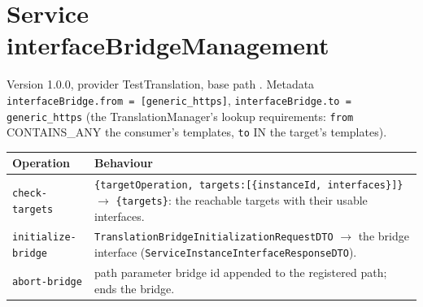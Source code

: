 \documentclass[a4paper]{arrowhead}
\begin{document}
\ArrowheadSetup
\section{Service interfaceBridgeManagement}
Version 1.0.0, provider TestTranslation, base path . Metadata \texttt{interfaceBridge.from = [generic\_https]}, \texttt{interfaceBridge.to = generic\_https} (the TranslationManager's lookup requirements: \texttt{from} CONTAINS\_ANY the consumer's templates, \texttt{to} IN the target's templates).
\begin{longtable}{p{}p{}}\toprule
Operation & Behaviour\\\midrule\endhead
\texttt{check-targets} & \texttt{\{targetOperation, targets:[\{instanceId, interfaces\}]\}} $\rightarrow$ \texttt{\{targets\}}: the reachable targets with their usable interfaces.\\
\texttt{initialize-bridge} & \texttt{TranslationBridgeInitializationRequestDTO} $\rightarrow$ the bridge interface (\texttt{ServiceInstanceInterfaceResponseDTO}).\\
\texttt{abort-bridge} & path parameter bridge id appended to the registered path; ends the bridge.\\
\bottomrule\end{longtable}
\end{document}
